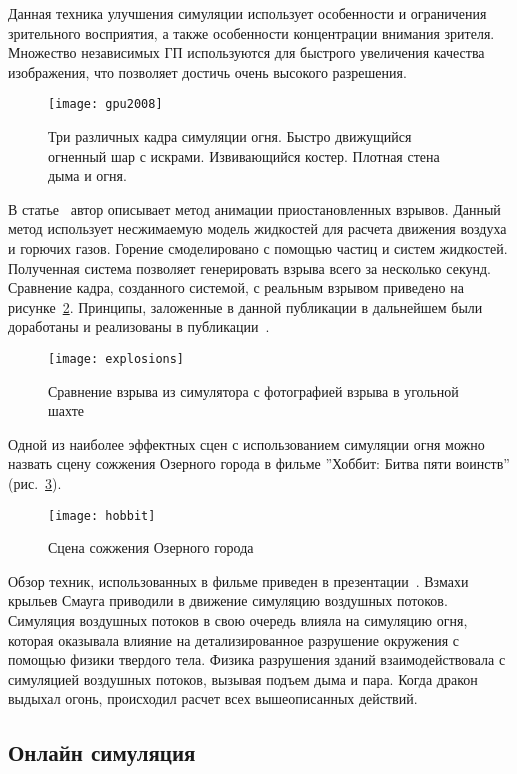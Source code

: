 Данная техника улучшения симуляции использует особенности и ограничения
зрительного восприятия, а также особенности концентрации внимания зрителя.
Множество независимых ГП используются для быстрого увеличения качества
изображения, что позволяет достичь очень высокого разрешения.
\begin{figure}[htb]
	\centering
	\texttt{[image: gpu2008]}
	\caption{Три различных кадра симуляции огня. Быстро движущийся огненный
	шар с искрами. Извивающийся костер. Плотная стена дыма и огня.}%
    \label{fig:gpu2008}
\end{figure}

В статье~\cite{suspendedExplosions} автор описывает метод анимации
приостановленных взрывов. Данный метод использует несжимаемую модель жидкостей
для расчета движения воздуха и горючих газов. Горение смоделировано с помощью
частиц и систем жидкостей. Полученная система позволяет генерировать взрыва
всего за несколько секунд. Сравнение кадра, созданного системой, с реальным
взрывом приведено на рисунке~\ref{fig:explosions}. Принципы, заложенные в
данной публикации в дальнейшем были доработаны и реализованы в
публикации~\cite{VortexExplosions}.
\begin{figure}[htb]
	\centering
	\texttt{[image: explosions]}
	\caption{Сравнение взрыва из симулятора с фотографией взрыва в угольной
    шахте}%
    \label{fig:explosions}
\end{figure}

Одной из наиболее эффектных сцен с использованием симуляции огня можно назвать
сцену сожжения Озерного города в фильме ''Хоббит: Битва пяти воинств''
(рис.~\ref{fig:hobbit}).
\begin{figure}[htb]
    \centering
    \texttt{[image: hobbit]}
    \caption{Сцена сожжения Озерного города}%
    \label{fig:hobbit}
\end{figure}
Обзор техник, использованных в фильме приведен в
презентации~\cite{hobbitSlides}.  Взмахи крыльев Смауга приводили в движение
симуляцию воздушных потоков.  Симуляция воздушных потоков в свою очередь влияла
на симуляцию огня, которая оказывала влияние на детализированное разрушение
окружения с помощью физики твердого тела. Физика разрушения зданий
взаимодействовала с симуляцией воздушных потоков, вызывая подъем дыма и пара.
Когда дракон выдыхал огонь, происходил расчет всех вышеописанных действий.

\subsection{Онлайн симуляция}

